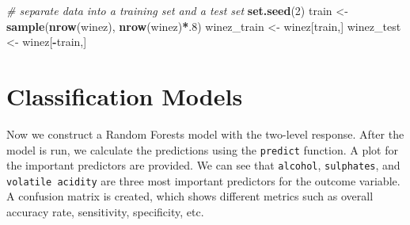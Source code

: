 \documentclass[
]{book}
\newenvironment{Shaded}{\begin{snugshade}}{\end{snugshade}}
\newcommand{\CommentTok}[1]{\textcolor[rgb]{0.56,0.35,0.01}{\textit{#1}}}
\newcommand{\DecValTok}[1]{\textcolor[rgb]{0.00,0.00,0.81}{#1}}
\newcommand{\FunctionTok}[1]{\textcolor[rgb]{0.13,0.29,0.53}{\textbf{#1}}}
\newcommand{\NormalTok}[1]{#1}
\newcommand{\OtherTok}[1]{\textcolor[rgb]{0.56,0.35,0.01}{#1}}
\newcommand{\SpecialCharTok}[1]{\textcolor[rgb]{0.81,0.36,0.00}{\textbf{#1}}}
\begin{document}
\begin{Shaded}
\begin{Highlighting}[]
\CommentTok{\# separate data into a training set and a test set }
\FunctionTok{set.seed}\NormalTok{(}\DecValTok{2}\NormalTok{)}
\NormalTok{train }\OtherTok{\textless{}{-}} \FunctionTok{sample}\NormalTok{(}\FunctionTok{nrow}\NormalTok{(winez), }\FunctionTok{nrow}\NormalTok{(winez)}\SpecialCharTok{*}\NormalTok{.}\DecValTok{8}\NormalTok{)}
\NormalTok{winez\_train }\OtherTok{\textless{}{-}}\NormalTok{ winez[train,]}
\NormalTok{winez\_test }\OtherTok{\textless{}{-}}\NormalTok{ winez[}\SpecialCharTok{{-}}\NormalTok{train,]}
\end{Highlighting}
\end{Shaded}

\hypertarget{classification-models}{%
\section{Classification Models}\label{classification-models}}

Now we construct a Random Forests model with the two-level response. After the model is run, we calculate the predictions using the \texttt{predict} function. A plot for the important predictors are provided. We can see that \texttt{alcohol}, \texttt{sulphates}, and \texttt{volatile\ acidity} are three most important predictors for the outcome variable. A confusion matrix is created, which shows different metrics such as overall accuracy rate, sensitivity, specificity, etc.
\end{document}
